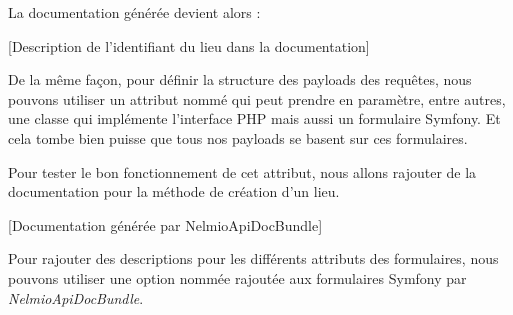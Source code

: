 \documentclass[big]{zmdocument}
\begin{document}
La documentation générée devient alors :



[Description de l'identifiant du lieu dans la documentation]




De la même façon, pour définir la structure des payloads des requêtes, nous pouvons utiliser un attribut nommé  qui peut prendre en paramètre, entre autres, une classe qui implémente l'interface PHP  mais aussi un formulaire Symfony. Et cela tombe bien puisse que tous nos payloads se basent sur ces formulaires.



Pour tester le bon fonctionnement de cet attribut, nous allons rajouter de la documentation pour la méthode de création d'un lieu.






[Documentation générée par NelmioApiDocBundle]


Pour rajouter des descriptions pour les différents attributs des formulaires, nous pouvons utiliser une option nommée  rajoutée aux formulaires Symfony par \textit{NelmioApiDocBundle}.
\end{document}

